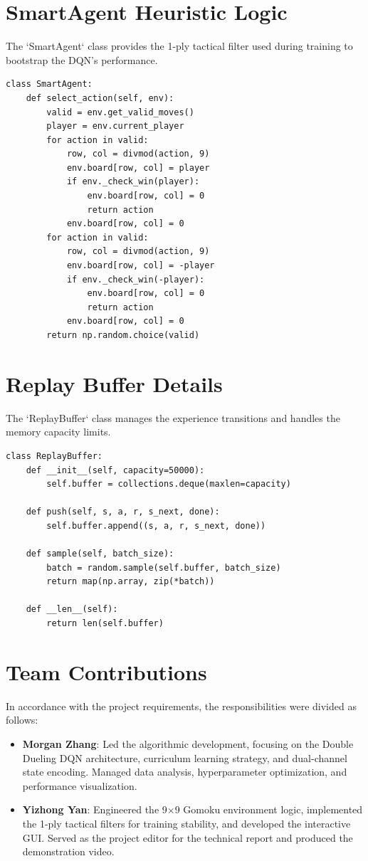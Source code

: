 \documentclass[9pt,a4paper,twocolumn,twoside]{rho-class/rho}
\begin{document}
\section{SmartAgent Heuristic Logic}
The `SmartAgent` class provides the 1-ply tactical filter used during training to bootstrap the DQN's performance.

\begin{verbatim}
class SmartAgent:
    def select_action(self, env):
        valid = env.get_valid_moves()
        player = env.current_player
        for action in valid:
            row, col = divmod(action, 9)
            env.board[row, col] = player
            if env._check_win(player):
                env.board[row, col] = 0
                return action
            env.board[row, col] = 0
        for action in valid:
            row, col = divmod(action, 9)
            env.board[row, col] = -player
            if env._check_win(-player):
                env.board[row, col] = 0
                return action
            env.board[row, col] = 0
        return np.random.choice(valid)
\end{verbatim}

\section{Replay Buffer Details}
The `ReplayBuffer` class manages the experience transitions and handles the memory capacity limits.

\begin{verbatim}
class ReplayBuffer:
    def __init__(self, capacity=50000):
        self.buffer = collections.deque(maxlen=capacity)

    def push(self, s, a, r, s_next, done):
        self.buffer.append((s, a, r, s_next, done))

    def sample(self, batch_size):
        batch = random.sample(self.buffer, batch_size)
        return map(np.array, zip(*batch))

    def __len__(self):
        return len(self.buffer)
\end{verbatim}

\section*{Team Contributions}
In accordance with the project requirements, the responsibilities were divided as follows:
\begin{itemize}
    \item \textbf{Morgan Zhang}: Led the algorithmic development, focusing on the Double Dueling DQN architecture, curriculum learning strategy, and dual-channel state encoding. Managed data analysis, hyperparameter optimization, and performance visualization.
    \item \textbf{Yizhong Yan}: Engineered the 9$\times$9 Gomoku environment logic, implemented the 1-ply tactical filters for training stability, and developed the interactive GUI. Served as the project editor for the technical report and produced the demonstration video.
\end{itemize}
\end{document}
